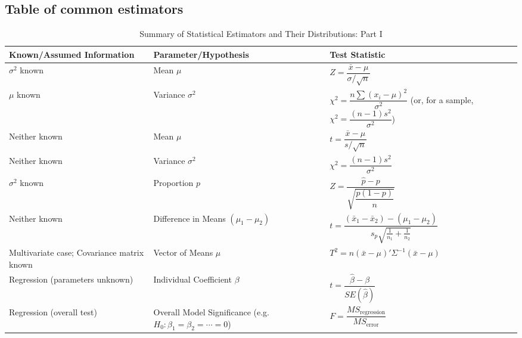 \documentclass{article}
\begin{document}
\subsection{Table of common estimators}


\begin{table}[H]
\centering
\caption{Summary of Statistical Estimators and Their Distributions: Part I}
\label{tab:estimators_part1}
\renewcommand{\arraystretch}{1.3}
\begin{tabular}{@{}p{5cm} p{4cm} p{6cm}@{}}
\toprule
\textbf{Known/Assumed Information} & \textbf{Parameter/Hypothesis} & \textbf{Test Statistic} \\
\midrule
$\sigma^2$ known  & Mean $\mu$ & 
$Z = \dfrac{\bar{x} - \mu}{\sigma/\sqrt{n}}$ \\[5pt]
\midrule
$\mu$ known  & Variance $\sigma^2$ & 
$\chi^2 = \dfrac{n\sum (x_i-\mu)^2}{\sigma^2}$ 
(or, for a sample, $\chi^2 = \dfrac{(n-1)s^2}{\sigma^2}$) \\[10pt]
\midrule
Neither known  & Mean $\mu$ &
$t = \dfrac{\bar{x} - \mu}{s/\sqrt{n}}$ \\[5pt]
\midrule
Neither known  & Variance $\sigma^2$ &
$\chi^2 = \dfrac{(n-1)s^2}{\sigma^2}$ \\[5pt]
\midrule
$\sigma^2$ known  & Proportion $p$ &
$Z = \dfrac{\hat{p} - p}{\sqrt{\dfrac{p(1-p)}{n}}}$ \\[5pt]
\midrule
Neither known  & Difference in Means $(\mu_1-\mu_2)$ &
$t = \dfrac{(\bar{x}_1-\bar{x}_2) - (\mu_1-\mu_2)}{s_p\sqrt{\frac{1}{n_1}+\frac{1}{n_2}}}$ \\[5pt]
\midrule
Multivariate case; Covariance matrix known  & Vector of Means $\mu$ &
$T^2 = n(\bar{x}-\mu)'\Sigma^{-1}(\bar{x}-\mu)$ \\[5pt]
\midrule
Regression (parameters unknown)  & Individual Coefficient $\beta$ &
$t = \dfrac{\hat{\beta} - \beta}{SE(\hat{\beta})}$ \\[5pt]
\midrule
Regression (overall test)  & Overall Model Significance \newline (e.g. $H_0: \beta_1=\beta_2=\cdots=0$) &
$F = \dfrac{MS_\text{regression}}{MS_\text{error}}$ \\
\bottomrule
\end{tabular}
\end{table}

\vspace{1em}
\end{document}
